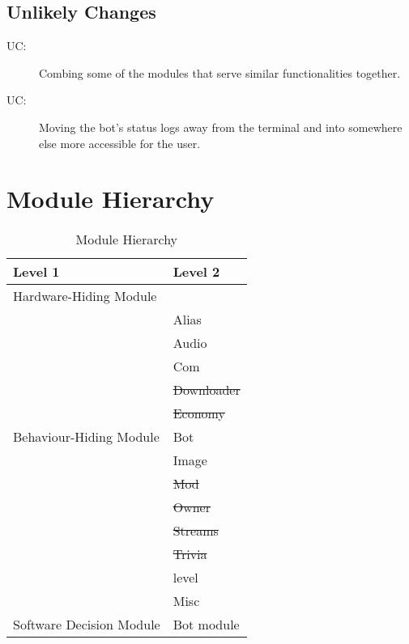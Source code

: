\documentclass[12pt, titlepage]{article}
\newcounter{ucnum}
\newcommand{\uctheucnum}{UC\theucnum}
\begin{document}
\subsection{Unlikely Changes} \label{SecUchange}

\begin{description}
\item[ \uctheucnum \label{ucModules}:] Combing some of the modules that serve similar functionalities together.
\item[ \uctheucnum \label{ucOutput}:] Moving the bot's status logs away from the terminal and into somewhere else more accessible for the user.

\end{description}

\section{Module Hierarchy} \label{SecMH}

\begin{description}
\item 
\end{description}


\begin{table}[H]
\centering
\begin{tabular}{p{} p{}}
\toprule
\textbf{Level 1} & \textbf{Level 2}\\
\midrule

{Hardware-Hiding Module} & ~ \\
\midrule

\multirow{11}{0.3\textwidth}{Behaviour-Hiding Module} & Alias\\
& Audio\\
& \color{blue}Com\\
& \st{Downloader}\\
& \st{Economy}\\
& \color{blue}Bot\\
& \color{black}Image\\ 
& \st{Mod}\\
& \st{Owner}\\
& \st{Streams}\\
& \st{Trivia}\\
& \color{blue} level\\
& \color{blue} Misc\\
\midrule

\multirow{1}{0.3\textwidth}{Software Decision Module} & {Bot module}\\
\bottomrule

\end{tabular}
\caption{Module Hierarchy}
\label{TblMH}
\end{table}
\end{document}
